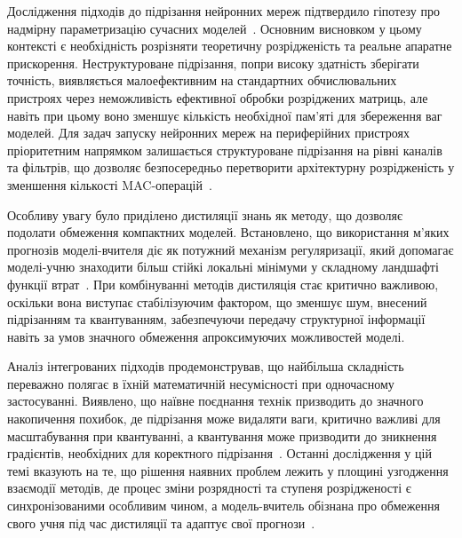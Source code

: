 \documentclass{pma-mthesis}
\begin{document}
Дослідження підходів до підрізання нейронних мереж підтвердило гіпотезу про надмірну параметризацію сучасних моделей~\cite{frankle2019lottery}. Основним висновком у цьому контексті є необхідність розрізняти теоретичну розрідженість та реальне апаратне прискорення. Неструктуроване підрізання, попри високу здатність зберігати точність, виявляється малоефективним на стандартних обчислювальних пристроях через неможливість ефективної обробки розріджених матриць, але навіть при цьому воно зменшує кількість необхідної пам'яті для збереження ваг моделей. Для задач запуску нейронних мереж на периферійних пристроях пріоритетним напрямком залишається структуроване підрізання на рівні каналів та фільтрів, що дозволяє безпосередньо перетворити архітектурну розрідженість у зменшення кількості MAC-операцій~\cite{gholami2022survey}.

Особливу увагу було приділено дистиляції знань як методу, що дозволяє подолати обмеження компактних моделей. Встановлено, що використання м’яких прогнозів моделі-вчителя діє як потужний механізм регуляризації, який допомагає моделі-учню знаходити більш стійкі локальні мінімуми у складному ландшафті функції втрат~\cite{gou2021knowledge}. При комбінуванні методів дистиляція стає критично важливою, оскільки вона виступає стабілізуючим фактором, що зменшує шум, внесений підрізанням та квантуванням, забезпечуючи передачу структурної інформації навіть за умов значного обмеження апроксимуючих можливостей моделі.

Аналіз інтегрованих підходів продемонстрував, що найбільша складність переважно полягає в їхній математичній несумісності при одночасному застосуванні. Виявлено, що наївне поєднання технік призводить до значного накопичення похибок, де підрізання може видаляти ваги, критично важливі для масштабування при квантуванні, а квантування може призводити до зникнення градієнтів, необхідних для коректного підрізання~\cite{Han2016DeepCompression}. Останні дослідження у цій темі вказують на те, що рішення наявних проблем лежить у площині узгодження взаємодії методів, де процес зміни розрядності та ступеня розрідженості є синхронізованими особливим чином, а модель-вчитель обізнана про обмеження свого учня під час дистиляції та адаптує свої прогнози~\cite{kim2020qkd,kim2021pqk,10946020}.
\end{document}
